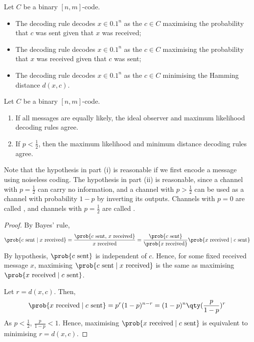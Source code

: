 \begin{definition}
    Let $C$ be a binary $[n,m]$-code.
    \begin{itemize}
        \item The  decoding rule decodes $x \in \qty{0,1}^n$ as the $c \in C$ maximising the probability that $c$ was sent given that $x$ was received;
        \item The  decoding rule decodes $x \in \qty{0,1}^n$ as the $c \in C$ maximising the probability that $x$ was received given that $c$ was sent;
        \item The  decoding rule decodes $x \in \qty{0,1}^n$ as the $c \in C$ minimising the Hamming distance $d(x,c)$.
    \end{itemize}
\end{definition}
\begin{lemma}
    Let $C$ be a binary $[n,m]$-code.
    \begin{enumerate}
        \item If all messages are equally likely, the ideal observer and maximum likelihood decoding rules agree.
        \item If $p < \frac{1}{2}$, then the maximum likelihood and minimum distance decoding rules agree.
    \end{enumerate}
\end{lemma}
Note that the hypothesis in part (i) is reasonable if we first encode a message using noiseless coding.
The hypothesis in part (ii) is reasonable, since a channel with $p = \frac{1}{2}$ can carry no information, and a channel with $p > \frac{1}{2}$ can be used as a channel with probability $1 - p$ by inverting its outputs.
Channels with $p = 0$ are called , and channels with $p = \frac{1}{2}$ are called .
\begin{proof}
    By Bayes' rule,
    \begin{align*}
        \prob{c \text{ sent} \mid x \text{ received}} = \frac{\prob{c \text{ sent, } x \text{ received}}}{x \text{ received}} = \frac{\prob{c \text{ sent}}}{\prob{x \text{ received}}} \prob{x \text{ received} \mid c \text{ sent}}
    \end{align*}
    By hypothesis, $\prob{c \text{ sent}}$ is independent of $c$.
    Hence, for some fixed received message $x$, maximising $\prob{c \text{ sent} \mid x \text{ received}}$ is the same as maximising $\prob{x \text{ received} \mid c \text{ sent}}$.

    Let $r = d(x,c)$.
    Then,
    \begin{align*}
        \prob{x \text{ received} \mid c \text{ sent}} = p^r (1-p)^{n-r} = (1-p)^n \qty(\frac{p}{1-p})^r
    \end{align*}
    As $p < \frac{1}{2}$, $\frac{p}{1-p} < 1$.
    Hence, maximising $\prob{x \text{ received} \mid c \text{ sent}}$ is equivalent to minimising $r = d(x,c)$.
\end{proof}
